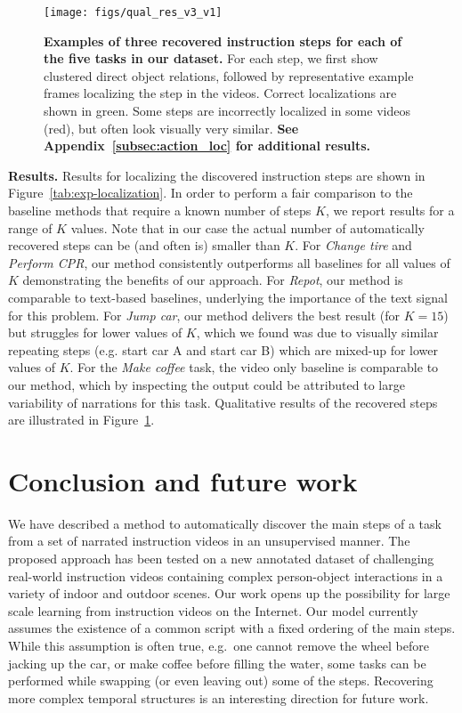 \documentclass[10pt,twocolumn,letterpaper]{article}
\begin{document}
%
%
%
%


\begin{figure}
%
\centering\texttt{[image: figs/qual\_res\_v3\_v1]}
\vspace{-1mm}
\caption{\footnotesize {\bf Examples of three recovered instruction steps for each of the five tasks in our dataset.} %
For each step, we first show clustered direct object relations, followed by representative example frames localizing the step in the videos. Correct localizations are shown in green. Some steps are incorrectly localized in some videos (red), but often look visually very similar.  
%
{\bf See Appendix~\ref{subsec:action_loc} for additional results.}
}
\label{fig:qualitative_results} 
\end{figure}


\textbf{Results.} 
%
Results for localizing the discovered instruction steps are shown
in Figure~\ref{tab:exp-localization}. 
In order to perform a fair comparison to the baseline methods that require a known number of steps $K$, we report results for a range of $K$ values. Note that in our case the actual number of automatically recovered steps can be (and often is) smaller than $K$.
%
%
For {\em Change tire} and {\em Perform CPR}, our method consistently outperforms all baselines for all values of $K$ demonstrating the benefits of our approach. 
For {\em Repot}, our method is comparable to text-based baselines, underlying the importance of the text signal for this problem.
For {\em Jump car}, our method delivers the best result (for $K=15$) but struggles for lower values of $K$, which we found was due to visually similar repeating steps (e.g. start car A and start car B) which are mixed-up for lower values of $K$.
For the {\em Make coffee} task, the video only baseline is comparable to our method, which by inspecting the output could be attributed to large variability of narrations for this task. 
Qualitative results of the recovered steps are illustrated in Figure~\ref{fig:qualitative_results}.

%
%
%
%
%
%
%
%
%
%
%
%
%
%
%
%
%
%
%
%


\section{Conclusion and future work}
We have described a method to automatically discover the main steps of a task from a set of narrated instruction videos in an unsupervised manner.
%
The proposed approach has been tested on a new annotated dataset of challenging real-world instruction videos containing complex person-object interactions in a variety of indoor and outdoor scenes. Our work opens up the possibility for large scale learning from instruction videos on the Internet.
Our model currently assumes the existence of a common script with a fixed ordering of the main steps.
While this assumption is often true, e.g.~one cannot remove the wheel before jacking up the car, or make coffee before filling the water, some tasks can be performed while swapping (or even leaving out) some of the steps. Recovering more complex temporal structures is an interesting direction for future work. 
%
%
%
%
%
%
%
%
%
%
\end{document}
